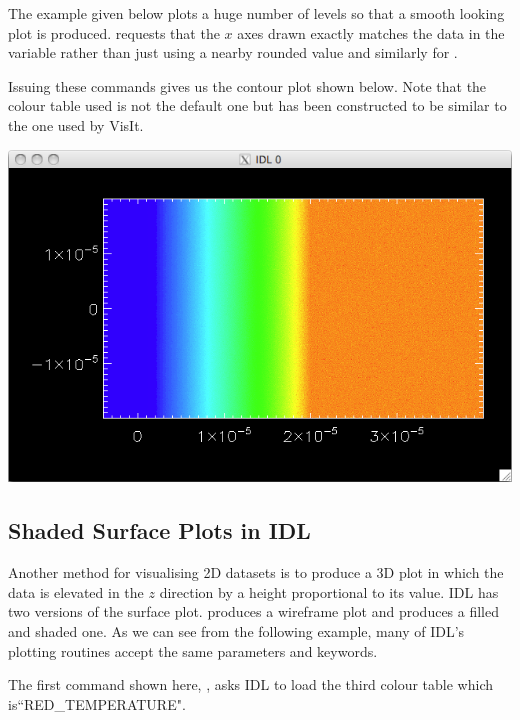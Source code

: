   The example given below plots a huge number of levels so that a smooth
  looking plot is produced.  requests that the $x$ axes drawn
  exactly matches the data in the  variable rather than just using
  a nearby rounded value and similarly for .
  Issuing these commands gives us the contour plot shown below. Note that
  the colour table used is not the default one but has been constructed to
  be similar to the one used by VisIt.
  \begin{center}
    \includegraphics[width=0.8\linewidth]{images/idl_contour}
  \end{center}


\subsection{Shaded Surface Plots in IDL}
  Another method for visualising 2D datasets is to produce a 3D plot in
  which the data is elevated in the $z$ direction by a height proportional
  to its value. IDL has two versions of the surface plot. 
  produces a wireframe plot and  produces a filled and
  shaded one. As we can see from the following example, many of IDL's
  plotting routines accept the same parameters and keywords.

  The first command shown here, , asks IDL to load the third
  colour table which is\linebreak ``RED\_TEMPERATURE".

